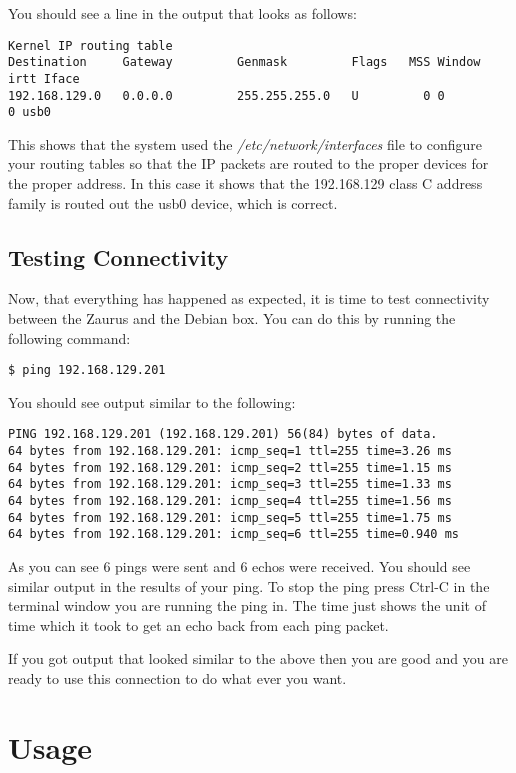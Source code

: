 \documentclass{article}
\begin{document}
You should see a line in the output that looks as follows:

\begin{verbatim}
Kernel IP routing table
Destination     Gateway         Genmask         Flags   MSS Window  irtt Iface
192.168.129.0   0.0.0.0         255.255.255.0   U         0 0          0 usb0
\end{verbatim}

This shows that the system used the \emph{/etc/network/interfaces} file
to configure your routing tables so that the IP packets are routed to
the proper devices for the proper address. In this case it shows that
the 192.168.129 class C address family is routed out the usb0 device,
which is correct.

\subsection{Testing Connectivity}

Now, that everything has happened as expected, it is time to test
connectivity between the Zaurus and the Debian box. You can do this by
running the following command:

\begin{verbatim}
$ ping 192.168.129.201
\end{verbatim}

You should see output similar to the following:

\begin{verbatim}
PING 192.168.129.201 (192.168.129.201) 56(84) bytes of data.
64 bytes from 192.168.129.201: icmp_seq=1 ttl=255 time=3.26 ms
64 bytes from 192.168.129.201: icmp_seq=2 ttl=255 time=1.15 ms
64 bytes from 192.168.129.201: icmp_seq=3 ttl=255 time=1.33 ms
64 bytes from 192.168.129.201: icmp_seq=4 ttl=255 time=1.56 ms
64 bytes from 192.168.129.201: icmp_seq=5 ttl=255 time=1.75 ms
64 bytes from 192.168.129.201: icmp_seq=6 ttl=255 time=0.940 ms
\end{verbatim}

As you can see 6 pings were sent and 6 echos were received. You should
see similar output in the results of your ping. To stop the ping press
Ctrl-C in the terminal window you are running the ping in. The time just
shows the unit of time which it took to get an echo back from each ping
packet.

If you got output that looked similar to the above then you are good and you
are ready to use this connection to do what ever you want.

\section{Usage}
\end{document}
